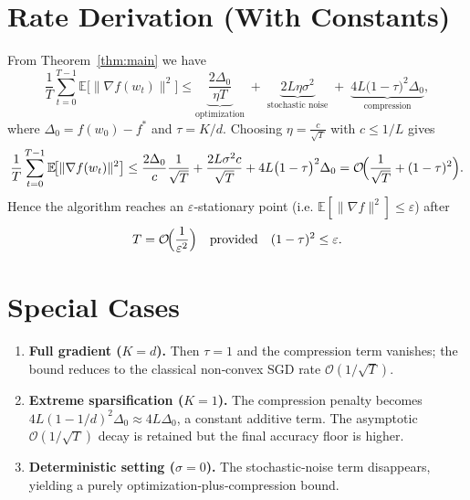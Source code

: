 \documentclass{article}
\newcommand{\E}{\mathbb{E}}
\begin{document}
\section*{Rate Derivation (With Constants)}
From Theorem~\ref{thm:main} we have
\[
\frac{1}{T}\sum_{t=0}^{T-1}\E\!\big[\|\nabla f(w_{t})\|^{2}\big]
\le
\underbrace{\frac{2\Delta_{0}}{\eta T}}_{\text{optimization}}
\;+\;
\underbrace{2L\eta\sigma^{2}}_{\text{stochastic noise}}
\;+\;
\underbrace{4L\bigl(1-\tau\bigr)^{2}\Delta_{0}}_{\text{compression}},
\]
where $\Delta_{0}=f(w_{0})-f^{*}$ and $\tau=K/d$.  
Choosing $\eta = \frac{c}{\sqrt{T}}$ with $c\le 1/L$ gives
\[
\frac{1}{T}\sum_{t=0}^{T-1}\E\!\big[\|\nabla f(w_{t})\|^{2}\big]
\le
\frac{2\Delta_{0}}{c}\frac{1}{\sqrt{T}}
+ \frac{2L\sigma^{2}c}{\sqrt{T}}
+4L\bigl(1-\tau\bigr)^{2}\Delta_{0}
= \mathcal{O}\!\Bigl(\frac{1}{\sqrt{T}}+(1-\tau)^{2}\Bigr).
\]
Hence the algorithm reaches an $\varepsilon$‑stationary point (i.e. $\E[\|\nabla f\|^{2}]\le\varepsilon$) after
\[
T = \mathcal{O}\!\Bigl(\frac{1}{\varepsilon^{2}}\Bigr)
\quad\text{provided}\quad
(1-\tau)^{2}\le\varepsilon.
\]

\section*{Special Cases}
\begin{enumerate}
\item \textbf{Full gradient ($K=d$).}  Then $\tau=1$ and the compression term vanishes; the bound reduces to the classical non‑convex SGD rate $\mathcal{O}(1/\sqrt{T})$.
\item \textbf{Extreme sparsification ($K=1$).}  The compression penalty becomes $4L(1-1/d)^{2}\Delta_{0}\approx4L\Delta_{0}$, a constant additive term. The asymptotic $\mathcal{O}(1/\sqrt{T})$ decay is retained but the final accuracy floor is higher.
\item \textbf{Deterministic setting ($\sigma=0$).}  The stochastic‑noise term disappears, yielding a purely optimization‑plus‑compression bound.
\end{enumerate}
\end{document}
